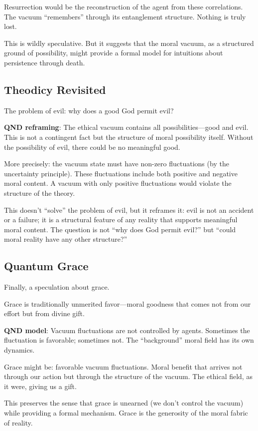 \documentclass[12pt]{article}
\begin{document}
Resurrection would be the reconstruction of the agent from these correlations. The vacuum ``remembers'' through its entanglement structure. Nothing is truly lost.

This is wildly speculative. But it suggests that the moral vacuum, as a structured ground of possibility, might provide a formal model for intuitions about persistence through death.

\subsection{Theodicy Revisited}

The problem of evil: why does a good God permit evil?

\textbf{QND reframing}: The ethical vacuum contains all possibilities---good and evil. This is not a contingent fact but the structure of moral possibility itself. Without the possibility of evil, there could be no meaningful good.

More precisely: the vacuum state must have non-zero fluctuations (by the uncertainty principle). These fluctuations include both positive and negative moral content. A vacuum with only positive fluctuations would violate the structure of the theory.

This doesn't ``solve'' the problem of evil, but it reframes it: evil is not an accident or a failure; it is a structural feature of any reality that supports meaningful moral content. The question is not ``why does God permit evil?'' but ``could moral reality have any other structure?''

\subsection{Quantum Grace}

Finally, a speculation about grace.

Grace is traditionally unmerited favor---moral goodness that comes not from our effort but from divine gift.

\textbf{QND model}: Vacuum fluctuations are not controlled by agents. Sometimes the fluctuation is favorable; sometimes not. The ``background'' moral field has its own dynamics.

Grace might be: favorable vacuum fluctuations. Moral benefit that arrives not through our action but through the structure of the vacuum. The ethical field, as it were, giving us a gift.

This preserves the sense that grace is unearned (we don't control the vacuum) while providing a formal mechanism. Grace is the generosity of the moral fabric of reality.
\end{document}

